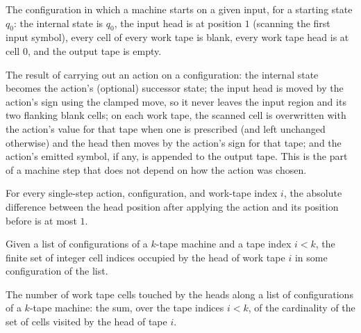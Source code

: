 \begin{definition}
\label{Turing.Cfg.init}
\leanok
{}
The configuration in which a machine starts on a given input, for a starting state
$q_0$: the internal state is $q_0$, the input head is at position $1$ (scanning the first
input symbol), every cell of every work tape is blank, every work tape head is at cell
$0$, and the output tape is empty.
\end{definition}

\begin{definition}
\label{Turing.Action.apply}
\leanok
{}
The result of carrying out an action on a configuration: the internal state becomes the
action's (optional) successor state; the input head is moved by the action's sign using
the clamped move, so it never leaves the input region and its two flanking blank cells;
on each work tape, the scanned cell is overwritten with the action's value for that tape
when one is prescribed (and left unchanged otherwise) and the head then moves by the
action's sign for that tape; and the action's emitted symbol, if any, is appended to the
output tape. This is the part of a machine step that does not depend on how the action
was chosen.
\end{definition}

\begin{lemma}
\label{Turing.workTapePos_apply_le}
\leanok
{}
For every single-step action, configuration, and work-tape index $i$, the absolute
difference between the head position after applying the action and its position before
is at most $1$.
\end{lemma}

\begin{definition}
\label{Turing.visitedOfCfgs}
\leanok
{}
Given a list of configurations of a $k$-tape machine and a tape index $i < k$, the finite
set of integer cell indices occupied by the head of work tape $i$ in some configuration
of the list.
\end{definition}

\begin{definition}
\label{Turing.spaceUsedOfCfgs}
\leanok
{}
The number of work tape cells touched by the heads along a list of configurations of a
$k$-tape machine: the sum, over the tape indices $i < k$, of the cardinality of the set
of cells visited by the head of tape $i$.
\end{definition}

